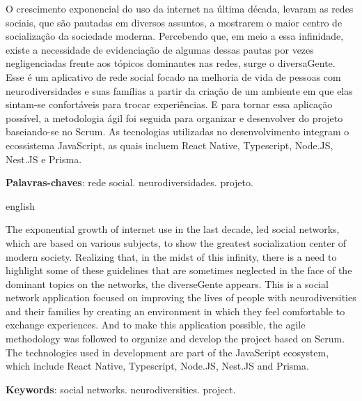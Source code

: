 
\setlength{\absparsep}{18pt} %
\begin{resumo}

O crescimento exponencial do uso da internet na última década, levaram as redes sociais, que são pautadas em diversos assuntos, a mostrarem o maior centro de socialização da sociedade moderna. Percebendo que, em meio a essa infinidade, existe a necessidade de evidenciação de algumas dessas pautas por vezes negligenciadas frente aos tópicos dominantes nas redes, surge o diversaGente. Esse é um aplicativo de rede social focado na melhoria de vida de pessoas com neurodiversidades e suas famílias a partir da criação de um ambiente em que elas sintam-se confortáveis para trocar experiências. E para tornar essa aplicação possível, a metodologia ágil foi seguida para organizar e desenvolver do projeto baseiando-se no Scrum. As tecnologias utilizadas no desenvolvimento integram o ecossistema JavaScript, as quais incluem React Native, Typescript, Node.JS, Nest.JS e Prisma.

 \textbf{Palavras-chaves}: rede social. neurodiversidades. projeto.

\end{resumo}

\begin{resumo}[Abstract]
 \begin{otherlanguage*}{english}

The exponential growth of internet use in the last decade, led social networks, which are based on various subjects, to show the greatest socialization center of modern society. Realizing that, in the midst of this infinity, there is a need to highlight some of these guidelines that are sometimes neglected in the face of the dominant topics on the networks, the diverseGente appears. This is a social network application focused on improving the lives of people with neurodiversities and their families by creating an environment in which they feel comfortable to exchange experiences. And to make this application possible, the agile methodology was followed to organize and develop the project based on Scrum. The technologies used in development are part of the JavaScript ecosystem, which include React Native, Typescript, Node.JS, Nest.JS and Prisma.

   \textbf{Keywords}: social networks. neurodiversities. project.
 \end{otherlanguage*}
\end{resumo}